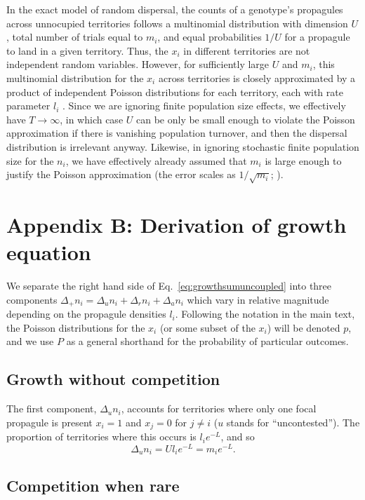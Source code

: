 \documentclass[11pt]{article}
\begin{document}
In the exact model of random dispersal, the counts of a genotype's propagules across unnocupied territories follows a multinomial distribution with dimension $U$, total number of trials equal to $m_i$, and equal probabilities $1/U$ for a propagule to land in a given territory. Thus, the $x_i$ in different territories are not independent random variables. However, for sufficiently large $U$ and $m_i$, this multinomial distribution for the $x_i$ across territories is closely approximated by a product of independent Poisson distributions for each territory, each with rate parameter $l_i$ \citep[Theorem 1]{arenbaev_1977}. Since we are ignoring finite population size effects, we effectively have $T\rightarrow \infty$, in which case $U$ can be only be small enough to violate the Poisson approximation if there is vanishing population turnover, and then the dispersal distribution is irrelevant anyway. Likewise, in ignoring stochastic finite population size for the $n_i$, we have effectively already assumed that $m_i$ is large enough to justify the Poisson approximation (the error scales as $1/\sqrt{m_i}$; \citealt{arenbaev_1977}).

\section*{Appendix B: Derivation of growth equation}

We separate the right hand side of Eq.~\eqref{eq:growthsumuncoupled} into three components $\Delta_+ n_i = \Delta_u n_i+\Delta_r n_i+\Delta_a n_i$ which vary in relative magnitude depending on the propagule densities $l_i$. Following the notation in the main text, the Poisson distributions for the $x_i$ (or some subset of the $x_i$) will be denoted $p$, and we use $P$ as a general shorthand for the probability of particular outcomes.

\subsection*{Growth without competition}

The first component, $\Delta_u n_i$, accounts for territories where only one focal propagule is present $x_i=1$ and $x_j=0$ for $j\neq i$ ($u$ stands for ``uncontested''). The proportion of territories where this occurs is $l_i e^{-L}$, and so 
\begin{equation}
\Delta_u n_i=Ul_i e^{-L}=m_i e^{-L}.
\end{equation}

\subsection*{Competition when rare}
\end{document}
